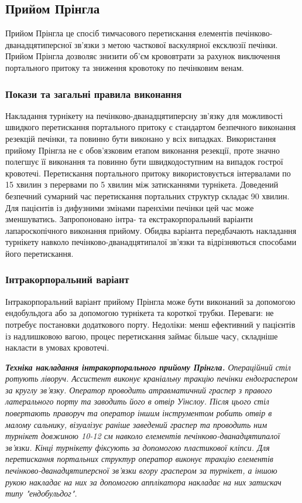 \begin{refsection}
\subsection{Прийом Прінгла}

Прийом Прінгла це спосіб тимчасового перетискання елементів печінково-дванадцятиперсної зв'язки з метою часткової васкулярної ексклюзії печінки. Прийом Прінгла дозволяє знизити об'єм крововтрати за рахунок виключення портального притоку та зниження кровотоку по печінковим венам.

\subsubsection{Покази та загальні правила виконання}

Накладання турнікету на печінково-дванадцятиперсну зв'язку для можливості швидкого перетискання портального притоку є стандартом безпечного виконання резекцій печінки, та повинно бути виконано у всіх випадках. Використання прийому Прінгла не є обов'язковим етапом виконання резекції, проте значно полегшує її виконання та повинно бути швидкодоступним на випадок гострої кровотечі. Перетискання портального притоку використовується інтервалами по 15 хвилин з перервами по 5 хвилин між затисканнями турнікета. Доведений безпечний сумарний час перетискання портальних структур складає 90 хвилин. Для пацієнтів із дифузними змінами паренхіми печінки цей час може зменшуватись. 
Запропоновано інтра- та екстракорпоральний варіанти лапароскопічного виконання прийому. Обидва варіанта передбачають накладання турнікету навколо печінково-дванадцятипалої зв'язки та відрізняються способами його перетискання.

\subsubsection{Інтракорпоральний варіант}

Інтракорпоральний варіант прийому Прінгла може бути виконаний за допомогою ендобульдога або за допомогою турнікета та короткої трубки. 
Переваги: не потребує постановки додаткового порту.
Недоліки: менш ефективний у пацієнтів із надлишковою вагою, процес перетискання займає більше часу, складніше накласти в умовах кровотечі.

\textit{ \textbf{Техніка накладання інтракорпорального прийому Прінгла.} Операційний стіл ротують ліворуч. Ассистент виконує краніальну тракцію печінки ендограспером за круглу зв'язку. Оператор проводить атравматичний граспер з правого  латерального порту та заводить його в отвір Уінслоу. Після цього стіл повертають праворуч та оператор іншим інструментом робить отвір в малому сальнику, візуалізує раніше заведений граспер та проводить ним турнікет довжиною 10-12 см навколо елементів печінково-дванадцятипалої зв'язки. Кінці турнікету фіксують за допомогою пластикової кліпси. Для перетискання портальних структур оператор виконує тракцію елементів печінково-дванадцятиперсної зв'язки вгору граспером за турнікет, а іншою рукою накладає на них за допомогою апплікатора накладає на них затискач типу "ендобульдог".}


\end{refsection}
